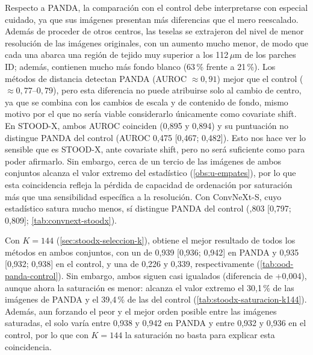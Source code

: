 Respecto a PANDA, la comparación con el control debe interpretarse con especial cuidado, ya que sus imágenes presentan más diferencias que el mero reescalado. Además de proceder de otros centros, las teselas se extrajeron del nivel de menor resolución de las imágenes originales, con un aumento mucho menor, de modo que cada una abarca una región de tejido muy superior a los 112\,$\mu$m de los parches ID; además, contienen mucho más fondo blanco (63\,\% frente a 21\,\%). Los métodos de distancia detectan PANDA (AUROC $\approx 0{,}91$) mejor que el control ($\approx 0{,}77$--$0{,}79$), pero esta diferencia no puede atribuirse solo al cambio de centro, ya que se combina con los cambios de escala y de contenido de fondo, mismo motivo por el que no sería viable considerarlo únicamente como covariate shift. En STOOD-X, ambos AUROC coinciden (0,895 y 0,894) y su puntuación no distingue PANDA del control (AUROC 0,475 [0,467; 0,482]). Esto nos hace ver lo sensible que es STOOD-X, ante covariate shift, pero no será suficiente como para poder afirmarlo. Sin embargo, cerca de un tercio de las imágenes de ambos conjuntos alcanza el valor extremo del estadístico (\cref{obs:u-empates}), por lo que esta coincidencia refleja la pérdida de capacidad de ordenación por saturación más que una sensibilidad específica a la resolución. Con ConvNeXt-S, cuyo estadístico satura mucho menos, \stoodx sí distingue PANDA del control (,803 [0,797; 0,809]; \cref{tab:convnext-stoodx}).

Con $K = 144$ (\cref{sec:stoodx-seleccion-k}), \stoodx obtiene el mejor resultado de todos los métodos en ambos conjuntos, con un \AUROC de 0,939 [0,936; 0,942] en PANDA y 0,935 [0,932; 0,938] en el control, y una  de 0,226 y 0,339, respectivamente (\cref{tab:ood-panda-control}). Sin embargo, ambos \AUROC siguen casi igualados (diferencia de +0,004), aunque ahora la saturación es menor: alcanza el valor extremo el 30,1\,\% de las imágenes de PANDA y el 39,4\,\% de las del control (\cref{tab:stoodx-saturacion-k144}). Además, aun forzando el peor y el mejor orden posible entre las imágenes saturadas, el \AUROC solo varía entre 0,938 y 0,942 en PANDA y entre 0,932 y 0,936 en el control, por lo que con $K = 144$ la saturación no basta para explicar esta coincidencia.

%

